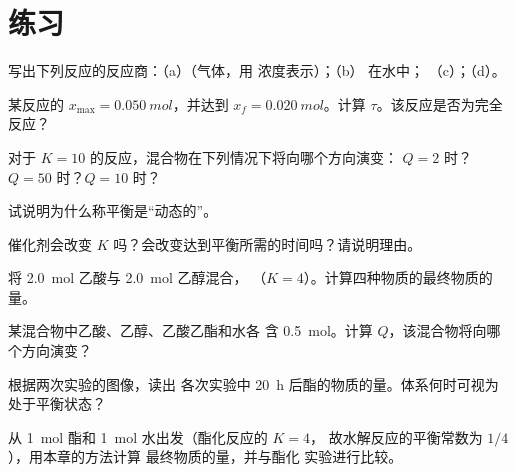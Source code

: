 \section{练习}

\begin{exercise}[$\star$]\label{exo:g12:equilibrium:1}
写出下列反应的反应商：（a）（气体，用
浓度表示）；（b） 在水中；
（c）；（d）。
\end{exercise}

\begin{exercise}[$\star$]\label{exo:g12:equilibrium:2}
某反应的 $x_{\max} = \qty{0.050}{mol}$，并达到
$x_f = \qty{0.020}{mol}$。计算 $\tau$。该反应是否为完全反应？
\end{exercise}

\begin{exercise}[$\star$]\label{exo:g12:equilibrium:3}
对于 $K = 10$ 的反应，混合物在下列情况下将向哪个方向演变：
$Q = 2$ 时？$Q = 50$ 时？$Q = 10$ 时？
\end{exercise}

\begin{exercise}[$\star$]\label{exo:g12:equilibrium:4}
试说明为什么称平衡是“动态的”。
\end{exercise}

\begin{exercise}[$\star$]\label{exo:g12:equilibrium:5}
催化剂会改变 $K$ 吗？会改变达到平衡所需的时间吗？请说明理由。
\end{exercise}

\begin{exercise}[$\star\star$]\label{exo:g12:equilibrium:6}
将 \qty{2.0}{mol} 乙酸与 \qty{2.0}{mol} 乙醇混合，
（$K = 4$）。计算四种物质的最终物质的量。
\end{exercise}

\begin{exercise}[$\star\star$]\label{exo:g12:equilibrium:7}
某混合物中乙酸、乙醇、乙酸乙酯和水各
含 \qty{0.5}{mol}。计算 $Q$，该混合物将向哪个方向演变？
\end{exercise}

\begin{exercise}[$\star\star$]\label{exo:g12:equilibrium:8}
根据两次实验的图像，读出
各次实验中 \qty{20}{h} 后酯的物质的量。体系何时可视为
处于平衡状态？
\end{exercise}

\begin{exercise}[$\star\star$]\label{exo:g12:equilibrium:9}
从 \qty{1}{mol} 酯和 \qty{1}{mol} 水出发（酯化反应的 $K = 4$，
故水解反应的平衡常数为 $1/4$），用本章的方法计算
最终物质的量，并与酯化
实验进行比较。
\end{exercise}

